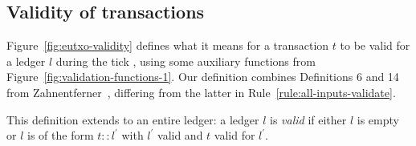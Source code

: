 \subsection{Validity of \EUTXO{} transactions}
\label{sec:eutxo-validity}

Figure~\ref{fig:eutxo-validity} defines what it means for a transaction $t$
to be valid for a ledger $l$ during the tick \currentTick, using some auxiliary functions from
Figure~\ref{fig:validation-functions-1}.
Our definition combines
Definitions 6 and 14 from Zahnentferner~\cite{Zahnentferner18-UTxO}, differing from
the latter in Rule~\ref{rule:all-inputs-validate}.

This definition extends to an entire ledger: a ledger
$l$ is \textit{valid} if either $l$ is empty or
$l$ is of the form $t::l^{\prime}$ with
$l^{\prime}$ valid and $t$ valid for $l^{\prime}$.
\vspace{-2mm}
